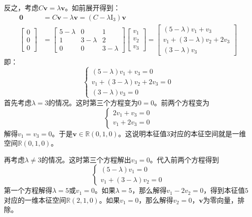 \documentclass[12pt,UTF8,fontset=none]{ctexbook}
\begin{document}
反之，考虑$C\mathbf{v} = \lambda \mathbf{v}$。如前展开得到：
\begin{align*}
    \mathbf{0} &= C\mathbf{v} - \lambda\mathbf{v} = (C - \lambda \mathrm{I}_3)\mathbf{v} \\
    \begin{bmatrix} 0 \\ 0 \\ 0 \end{bmatrix} &=  \begin{bmatrix} 5- \lambda & 0 & 1 \\ 1 & 3- \lambda & 2 \\ 0 & 0 & 3- \lambda \end{bmatrix} \begin{bmatrix}
       v_1\\ v_2 \\ v_3
    \end{bmatrix} =  \begin{bmatrix}
       (5 - \lambda)v_1 +v_3 \\ v_1 + (3 - \lambda)v_2 + 2v_3 \\ (3 - \lambda)v_3
    \end{bmatrix}
\end{align*}
即：
$$
\left\{
    \begin{aligned}
        (5 - \lambda)v_1 + v_3 = 0 \\
        v_1 + (3 - \lambda)v_2 + 2v_3 = 0 \\
        (3 - \lambda)v_3 = 0
    \end{aligned}
\right.
$$
首先考虑$\lambda = 3$的情况。这时第三个方程变为$0 = 0$。前两个方程变为
$$
\left\{
    \begin{aligned}
        2v_1 + v_3 = 0 \\
        v_1  + 2v_3 = 0 
    \end{aligned}
\right.
$$
解得$v_1 = v_3 = 0$。于是$\mathbf{v} \in \mathbb{R}(0,1,0)$。这说明本征值$3$对应的本征空间就是一维空间$\mathbb{R}(0,1,0)$。

再考虑$\lambda\neq 3$的情况。这时第三个方程解出$v_3 = 0$。代入前两个方程得到
$$
\left\{
    \begin{aligned}
        (5 - \lambda)v_1 = 0 \\
        v_1 + (3 - \lambda)v_2 = 0 
    \end{aligned}
\right.
$$
第一个方程解得$\lambda = 5$或$v_1 = 0$。如果$\lambda = 5$，那么解得$v_1 -2 v_2=0 $，得到本征值$5$对应的一维本征空间$\mathbb{R}(2,1,0)$。如果$v_1 = 0$，那么解得$v_2 = 0$，$\mathbf{v}$为零向量，排除。
\end{document}
